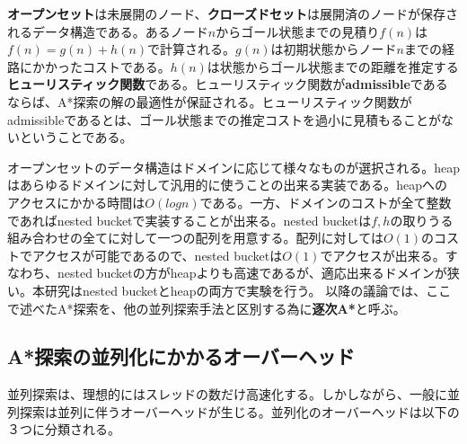 \documentclass[uplatex]{jsarticle}
\begin{document}
\textbf{オープンセット}は未展開のノード、\textbf{クローズドセット}は展開済のノードが保存されるデータ構造である。あるノード$n$からゴール状態までの見積り$f(n)$は$f(n) = g(n) + h(n)$で計算される。$g(n)$は初期状態からノード$n$までの経路にかかったコストである。$h(n)$は状態からゴール状態までの距離を推定する\textbf{ヒューリスティック関数}である。ヒューリスティック関数が\textbf{admissible}であるならば、A*探索の解の最適性が保証される。ヒューリスティック関数がadmissibleであるとは、ゴール状態までの推定コストを過小に見積もることがないということである。

オープンセットのデータ構造はドメインに応じて様々なものが選択される。heapはあらゆるドメインに対して汎用的に使うことの出来る実装である。heapへのアクセスにかかる時間は$O(logn)$である。一方、ドメインのコストが全て整数であればnested bucketで実装することが出来る。nested bucketは$f, h$の取りうる組み合わせの全てに対して一つの配列を用意する。配列に対しては$O(1)$のコストでアクセスが可能であるので、nested bucketは$O(1)$でアクセスが出来る。すなわち、nested bucketの方がheapよりも高速であるが、適応出来るドメインが狭い。本研究はnested bucketとheapの両方で実験を行う。
以降の議論では、ここで述べたA*探索を、他の並列探索手法と区別する為に\textbf{逐次A*}と呼ぶ。


\subsection{A*探索の並列化にかかるオーバーヘッド}

並列探索は、理想的にはスレッドの数だけ高速化する。しかしながら、一般に並列探索は並列に伴うオーバーヘッドが生じる。並列化のオーバーヘッドは以下の３つに分類される。
\end{document}
